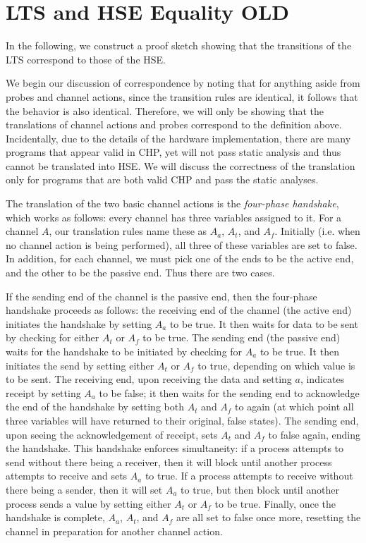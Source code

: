 \documentclass[times, 10pt]{article}
\begin{document}
\section*{LTS and HSE Equality OLD}
In the following, we construct a proof sketch showing that the transitions of
the LTS correspond to those of the HSE.

We begin our discussion of correspondence by noting that for anything aside from
probes and channel actions, since the transition rules are identical, it follows
that the behavior is also identical. Therefore, we will only be showing that the
translations of channel actions and probes correspond to the definition above.
Incidentally, due to the details of the hardware implementation, there are many
programs that appear valid in CHP, yet will not pass static analysis and thus
cannot be translated into HSE. We will discuss the correctness of the
translation only for programs that are both valid CHP and pass the static
analyses.

The translation of the two basic channel actions is the \emph{four-phase
handshake}, which works as follows: every channel has three variables assigned
to it. For a channel $A$, our translation rules name these as $A_a$, $A_t$, and
$A_f$. Initially (i.e. when no channel action is being performed), all three of
these variables are set to false. In addition, for each channel, we must pick
one of the ends to be the active end, and the other to be the passive end. Thus
there are two cases.

If the sending end of the channel is the passive end, then the four-phase
handshake proceeds as follows: the receiving end of the channel (the active end)
initiates the handshake by setting $A_a$ to be true.  It then waits for data to
be sent by checking for either $A_t$ or $A_f$ to be true.  The sending end (the
passive end) waits for the handshake to be initiated by checking for $A_a$ to be
true. It then initiates the send by setting either $A_t$ or $A_f$ to true,
depending on which value is to be sent. The receiving end, upon receiving the
data and setting $a$, indicates receipt by setting $A_a$ to be false; it then
waits for the sending end to acknowledge the end of the handshake by setting
both $A_t$ and $A_f$ to again (at which point all three variables will have
returned to their original, false states). The sending end, upon seeing the
acknowledgement of receipt, sets $A_t$ and $A_f$ to false again, ending
the handshake. This handshake enforces simultaneity: if a process attempts to
send without there being a receiver, then it will block until another process
attempts to receive and sets $A_a$ to true. If a process attempts to receive
without there being a sender, then it will set $A_a$ to true, but then block
until another process sends a value by setting either $A_t$ or $A_f$ to be true.
Finally, once the handshake is complete, $A_a$, $A_t$, and $A_f$ are all set to
false once more, resetting the channel in preparation for another channel
action.
\end{document}
